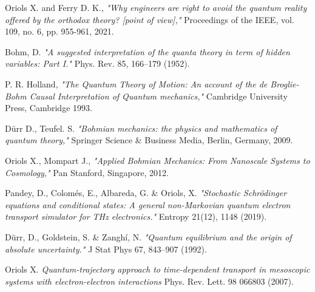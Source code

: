 \documentclass[11pt, a4paper]{article} %
\begin{document}



\newpage
\begin{thebibliography}{1}
{\footnotesize 

Oriols X. and Ferry D. K., {\em "Why engineers are right to avoid the quantum reality offered by the orthodox theory? [point of view],"} Proceedings of the IEEE, vol. 109, no. 6, pp. 955-961, 2021.

Bohm, D. {\em "A suggested interpretation of the quanta theory in term of hidden variables: Part I."} Phys. Rev. 85, 166–179 (1952).

P. R. Holland, {\em "The Quantum Theory of Motion: An account of the de Broglie-Bohm Causal Interpretation of Quantum
mechanics,"} Cambridge University Press, Cambridge 1993.

Dürr D., Teufel. S. {\em "Bohmian mechanics: the physics and mathematics of quantum theory,"} Springer Science \& Business Media, Berlin, Germany, 2009.

	Oriols X., Mompart J., {\em "Applied Bohmian Mechanics: From Nanoscale Systems to Cosmology,"} Pan Stanford, Singapore, 2012.
	
Pandey, D., Colomés, E., Albareda, G. \& Oriols, X. {\em "Stochastic Schrödinger equations and conditional states: A general non-Markovian quantum electron transport simulator for THz electronics."} Entropy 21(12), 1148 (2019).

Dürr, D., Goldstein, S. \& Zanghí, N. {\em "Quantum equilibrium and the origin of absolute uncertainty."} J Stat Phys 67, 843–907 (1992).

Oriols X. {\em Quantum-trajectory approach to time-dependent transport in mesoscopic systems with electron-electron interactions} Phys. Rev. Lett. 98 066803 (2007).


}
\end{thebibliography}
\end{document}
